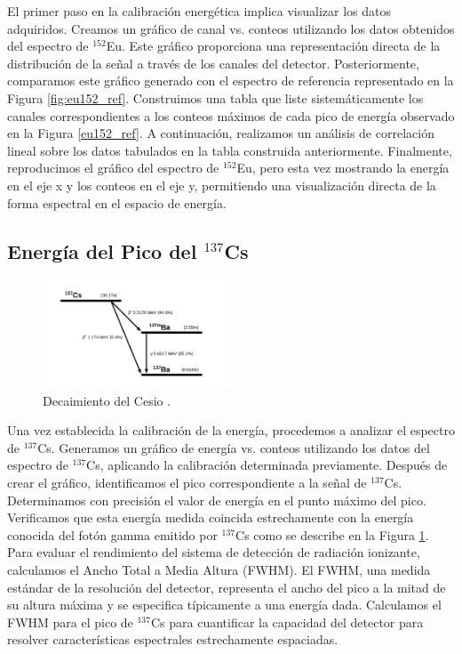 \documentclass[twocolumn,a4paper,11pt]{scrartcl}
\begin{document}
El primer paso en la calibración energética implica visualizar los datos adquiridos. Creamos un gráfico de canal vs. conteos utilizando los datos obtenidos del espectro de $^{152}$Eu. Este gráfico proporciona una representación directa de la distribución de la señal a través de los canales del detector.  Posteriormente, comparamos este gráfico generado con el espectro de referencia representado en la Figura \ref{fig:eu152_ref}. Construimos una tabla que liste sistemáticamente los canales correspondientes a los conteos máximos de cada pico de energía observado en la Figura \ref{eu152_ref}. A continuación, realizamos un análisis de correlación lineal sobre los datos tabulados en la tabla construida anteriormente. Finalmente, reproducimos el gráfico del espectro de $^{152}$Eu, pero esta vez mostrando la energía en el eje x y los conteos en el eje y, permitiendo una visualización directa de la forma espectral en el espacio de energía.

\subsection*{Energía del Pico del $^{137}$Cs}


\begin{figure}[]
  \includegraphics[width=0.50\textwidth]{decaimiento_cesio.png}
  \caption{Decaimiento del Cesio \cite{FirestoneShirley1996} \cite{Garrett1980}.}
  \label{fig:decaimiento_cs}
\end{figure}

Una vez establecida la calibración de la energía, procedemos a analizar el espectro de $^{137}$Cs. Generamos un gráfico de energía vs. conteos utilizando los datos del espectro de $^{137}$Cs, aplicando la calibración determinada previamente. Después de crear el gráfico, identificamos el pico correspondiente a la señal de $^{137}$Cs. Determinamos con precisión el valor de energía en el punto máximo del pico. Verificamos que esta energía medida coincida estrechamente con la energía conocida del fotón gamma emitido por $^{137}$Cs como se describe en la Figura \ref{fig:decaimiento_cs}. Para evaluar el rendimiento del sistema de detección de radiación ionizante, calculamos el Ancho Total a Media Altura (FWHM). El FWHM, una medida estándar de la resolución del detector, representa el ancho del pico a la mitad de su altura máxima y se especifica típicamente a una energía dada. Calculamos el FWHM para el pico de $^{137}$Cs para cuantificar la capacidad del detector para resolver características espectrales estrechamente espaciadas.
\end{document}
